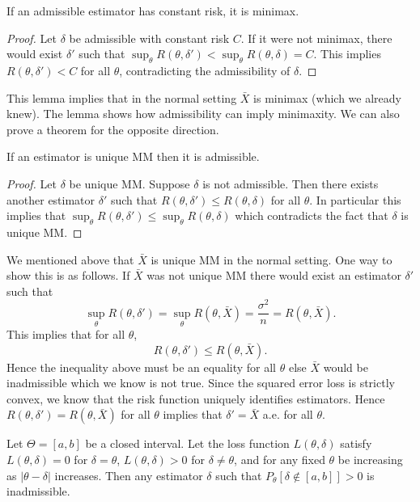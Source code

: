 \begin{lemma}
	If an admissible estimator has constant risk, it is minimax.
\end{lemma}

\begin{proof}
	Let $\delta$ be admissible with constant risk $C$. If it were not minimax, there would exist $\delta'$ such that $\sup_\theta R(\theta, \delta') < \sup_\theta R(\theta, \delta) = C$. This implies $R(\theta, \delta') < C$ for all $\theta$, contradicting the admissibility of $\delta$.
\end{proof}

\noindent This lemma implies that in the normal setting $\bar{X}$ is minimax (which we already knew). The lemma shows how admissibility can imply minimaxity. We can also prove a theorem for the opposite direction.

\begin{theorem}
	If an estimator is unique MM then it is admissible.
\end{theorem}

\begin{proof}
	Let $\delta$ be unique MM. Suppose $\delta$ is not admissible. Then there exists another estimator $\delta'$ such that $R(\theta, \delta') \leq R(\theta, \delta)$ for all $\theta$. In particular this implies that $\sup_\theta R(\theta, \delta') \leq \sup_\theta R(\theta, \delta)$ which contradicts the fact that $\delta$ is unique MM.
\end{proof}

\noindent We mentioned above that $\bar{X}$ is unique MM in the normal setting. One way to show this is as follows. If $\bar{X}$ was not unique MM there would exist an estimator $\delta'$ such that \[
	\sup_\theta R(\theta, \delta') = \sup_\theta R(\theta, \bar{X}) = \frac{\sigma^2}{n} = R(\theta, \bar{X}).
\] This implies that for all $\theta$, \[
	R(\theta, \delta') \leq R(\theta, \bar{X}).
\] Hence the inequality above must be an equality for all $\theta$ else $\bar{X}$ would be inadmissible which we know is not true. Since the squared error loss is strictly convex, we know that the risk function uniquely identifies estimators. Hence $R(\theta, \delta') = R(\theta, \bar{X})$ for all $\theta$ implies that $\delta' = \bar{X}$ a.e. for all $\theta$.

\begin{lemma}
	Let $\Theta = [a, b]$ be a closed interval. Let the loss function $L(\theta, \delta)$ satisfy $L(\theta, \delta) = 0$ for $\delta = \theta$, $L(\theta, \delta) > 0$ for $\delta \neq \theta$, and for any fixed $\theta$ be increasing as $|\theta - \delta|$ increases. Then any estimator $\delta$ such that $P_\theta[\delta \notin [a, b]] > 0$ is inadmissible.
\end{lemma}

